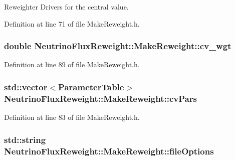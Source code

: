 Reweighter Drivers for the central value. 



Definition at line 71 of file Make\-Reweight.\-h.

\hypertarget{class_neutrino_flux_reweight_1_1_make_reweight_abb823dae6f381aa78ee9cbbffeafc3d4}{
\subsubsection[{cv\-\_\-wgt}]{\setlength{\rightskip}{0pt plus 5cm}double Neutrino\-Flux\-Reweight\-::\-Make\-Reweight\-::cv\-\_\-wgt\hspace{0.3cm}{\ttfamily [private]}}}\label{class_neutrino_flux_reweight_1_1_make_reweight_abb823dae6f381aa78ee9cbbffeafc3d4}


Definition at line 89 of file Make\-Reweight.\-h.

\hypertarget{class_neutrino_flux_reweight_1_1_make_reweight_a5146359dee518a9cbc8eafd78ab32f5b}{
\subsubsection[{cv\-Pars}]{\setlength{\rightskip}{0pt plus 5cm}std\-::vector$<${\bf Parameter\-Table}$>$ Neutrino\-Flux\-Reweight\-::\-Make\-Reweight\-::cv\-Pars\hspace{0.3cm}{\ttfamily [private]}}}\label{class_neutrino_flux_reweight_1_1_make_reweight_a5146359dee518a9cbc8eafd78ab32f5b}


Definition at line 83 of file Make\-Reweight.\-h.

\hypertarget{class_neutrino_flux_reweight_1_1_make_reweight_ae182e413fc79d37ae640a37edea61555}{
\subsubsection[{file\-Options}]{\setlength{\rightskip}{0pt plus 5cm}std\-::string Neutrino\-Flux\-Reweight\-::\-Make\-Reweight\-::file\-Options\hspace{0.3cm}{\ttfamily [private]}}}\label{class_neutrino_flux_reweight_1_1_make_reweight_ae182e413fc79d37ae640a37edea61555}


